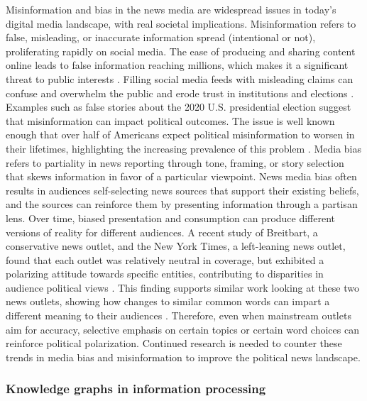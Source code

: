 \documentclass{scrartcl}
\begin{document}
Misinformation and bias in the news media are widespread issues in today's digital media landscape, with real societal implications. Misinformation refers to false, misleading, or inaccurate information spread (intentional or not), proliferating rapidly on social media. The ease of producing and sharing content online leads to false information reaching millions, which makes it a significant threat to public interests  \cite{r1}.
Filling social media feeds with misleading claims can confuse and overwhelm the public and erode trust in institutions and elections \cite{r2}. Examples such as false stories about the 2020 U.S. presidential election suggest that misinformation can impact political outcomes. The issue is well known enough that over half of Americans expect political misinformation to worsen in their lifetimes, highlighting the increasing prevalence of this problem  \cite{r3}\cite{r4}. 
Media bias refers to partiality in news reporting through tone, framing, or story selection that skews information in favor of a particular viewpoint. News media bias often results in audiences self-selecting news sources that support their existing beliefs, and the sources can reinforce them by presenting information through a partisan lens. Over time, biased presentation and consumption can produce different versions of reality for different audiences.
A recent study of Breitbart, a conservative news outlet, and the New York Times, a left-leaning news outlet, found that each outlet was relatively neutral in coverage, but exhibited a polarizing attitude towards specific entities, contributing to disparities in audience political views 
 \cite{r5}. This finding supports similar work looking at these two news outlets, showing how changes to similar common words can impart a different meaning to their audiences  \cite{r6}. Therefore, even when mainstream outlets aim for accuracy, selective emphasis on certain topics or certain word choices can reinforce political polarization. Continued research is needed to counter these trends in media bias and misinformation to improve the political news landscape.

\subsubsection{Knowledge graphs in information processing}
\end{document}
